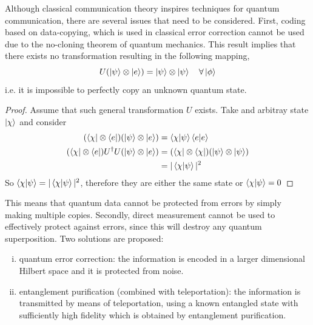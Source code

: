 \documentclass[10pt,a4paper]{book}
\numberwithin{equation}{chapter}
\numberwithin{figure}{chapter}
\numberwithin{table}{chapter}
\begin{document}
Although classical communication theory inspires techniques for quantum communication, there are several issues that need to be considered. First, coding based on data-copying, which is used in classical error correction cannot be used due to the no-cloning theorem of quantum mechanics. This result implies that there exists no transformation resulting in the following mapping,
\begin{equation}
U(\ket{\psi}\otimes \ket{e})= \ket{\psi}\otimes \ket{\psi} \quad \forall \ket{\phi}
\end{equation}
i.e. it is impossible to perfectly copy an unknown quantum state.
\begin{proof} Assume that such general transformation $U$ exists. Take and arbitray state $\ket{\chi}$ and consider
\begin{align}
(\bra{\chi}\otimes \bra{e})( \ket{\psi}\otimes \ket{e}) &= \braket{\chi|\psi}\braket{e|e}\\
(\bra{\chi}\otimes \bra{e})U^{\dagger}U( \ket{\psi}\otimes \ket{e}) &= (\bra{\chi}\otimes \bra{\chi})( \ket{\psi}\otimes \ket{\psi})\\
&= \vert \braket{\chi |\psi}\vert^{2}
\end{align}
So $\braket{\chi|\psi}=\vert \braket{\chi |\psi}\vert^{2}$, therefore they are either the same state or $\braket{\chi |\psi}=0$
\end{proof}
This means that quantum data cannot be protected from errors by simply making multiple copies. Secondly, direct measurement cannot be used to effectively protect against errors, since this will destroy any quantum superposition. Two solutions are proposed:
\begin{enumerate}[(i)]
\item quantum error correction: the information is encoded in a larger dimensional Hilbert space and it is protected from noise.
\item entanglement purification (combined with teleportation): the information is transmitted by means of teleportation, using a known entangled state with sufficiently high fidelity which is obtained by entanglement purification.
\end{enumerate}
\end{document}

